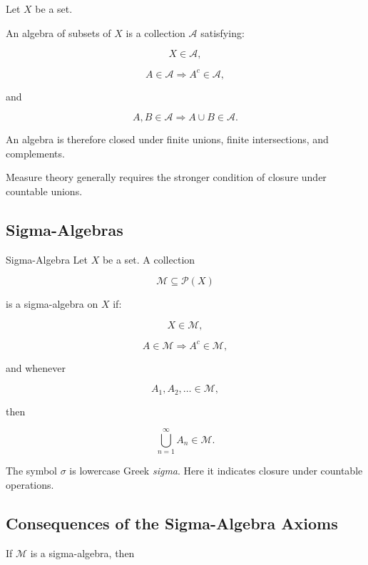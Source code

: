 Let \(X\) be a set.

An algebra of subsets of \(X\) is a collection \(\mathcal{A}\) satisfying:

\[
X\in\mathcal{A},
\]

\[
A\in\mathcal{A}
\Longrightarrow
A^c\in\mathcal{A},
\]

and

\[
A,B\in\mathcal{A}
\Longrightarrow
A\cup B\in\mathcal{A}.
\]

An algebra is therefore closed under finite unions, finite intersections,
and complements.

Measure theory generally requires the stronger condition of closure under
countable unions.

\subsection{Sigma-Algebras}
\label{subsec:sigma-algebras}

\begin{definitionbox}{Sigma-Algebra}
Let \(X\) be a set. A collection

\[
\mathcal{M}\subseteq\mathcal{P}(X)
\]

is a sigma-algebra on \(X\) if:

\[
\boxed{
X\in\mathcal{M},
}
\]

\[
\boxed{
A\in\mathcal{M}
\Longrightarrow
A^c\in\mathcal{M},
}
\]

and whenever

\[
A_1,A_2,\ldots\in\mathcal{M},
\]

then

\[
\boxed{
\bigcup_{n=1}^{\infty}A_n\in\mathcal{M}.
}
\]

The symbol \(\sigma\) is lowercase Greek \emph{sigma}. Here it indicates
closure under countable operations.
\end{definitionbox}

\subsection{Consequences of the Sigma-Algebra Axioms}
\label{subsec:sigma-algebra-consequences}

If \(\mathcal{M}\) is a sigma-algebra, then

